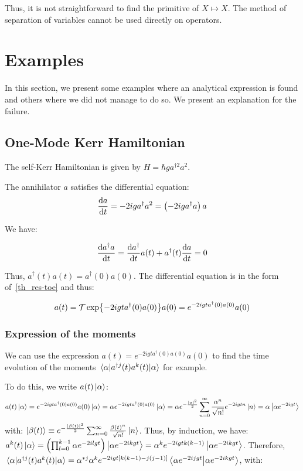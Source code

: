 Thus, it is not straightforward to find the primitive of $X \mapsto X$. The method of separation of variables cannot be used directly on operators.

\section{Examples}
In this section, we present some examples where an analytical expression is found and others where we did not manage to do so. We present an explanation for the failure.

\subsection{One-Mode Kerr Hamiltonian} \label{self-kerr-exact-sol}
The self-Kerr Hamiltonian is given by $H = \hbar g a^{\dagger 2} a^2$.

The annihilator $a$ satisfies the differential equation:
\begin{equation}
    \dv{a}{t} = -2ig a^\dagger a^2 = \left(-2ig a^\dagger a\right) a
\end{equation}

We have:

\begin{equation}
    \dv{a^\dagger a}{t} = \dv{a^\dagger}{t} a(t) + a^\dagger(t) \dv{a}{t} = 0
\end{equation}

Thus, $a^\dagger(t) a(t) = a^\dagger(0) a(0)$. The differential equation is in the form of~\autoref{th_res-toe} and thus:

\begin{equation}
    a(t) = \mathcal{T}\exp{-2 i g t a^\dagger(0) a(0)} a(0) = e^{-2 i g t a^\dagger(0) a(0)} a(0)
\end{equation}

\subsubsection{Expression of the moments}
We can use the expression $a(t) = e^{-2 i g t a^\dagger(0) a(0)} a(0)$ to find the time evolution of the moments $\mel{\alpha}{a^{\dagger j}(t) a^k(t)}{\alpha}$ for example.

To do this, we write $a(t) \ket{\alpha}$:
\begin{equation}
    a(t) \ket{\alpha} = e^{-2 i g t a^\dagger(0) a(0)} a(0) \ket{\alpha} = \alpha e^{-2 i g t a^\dagger(0) a(0)} \ket{\alpha} = \alpha e^{-\frac{|\alpha|^2}{2}} \sum_{n=0}^\infty \frac{\alpha^n}{\sqrt{n!}} e^{-2 i g t n} \ket{n} = \alpha \ket{\alpha e^{-2 i g t}}
\end{equation}
with: $\ket{\beta(t)} \equiv e^{-\frac{|\beta(t)|^2}{2}} \sum_{n=0}^\infty \frac{\beta(t)^n}{\sqrt{n!}} \ket{n}$. Thus, by induction, we have: $a^k(t) \ket{\alpha} = \left(\prod_{l=0}^{k-1} \alpha e^{-2 i l g t} \right) \ket{\alpha e^{-2 i k g t}} = \alpha^k e^{-2 i g t k(k-1)} \ket{\alpha e^{-2 i k g t}}$. Therefore, $\mel{\alpha}{a^{\dagger j}(t) a^k(t)}{\alpha} = \alpha^{* j} \alpha^k e^{-2 i g t [k(k-1) - j(j-1)]} \braket{\alpha e^{-2 i j g t}}{\alpha e^{-2 i k g t}}$, with:

